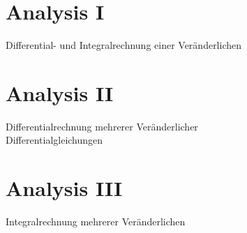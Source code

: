 \documentclass[a4paper,10pt]{article}
\title{}
\author{Marten Lienen}
\begin{document}
\maketitle

\section{Analysis I}
 
Differential- und Integralrechnung einer Veränderlichen

\section{Analysis II}

Differentialrechnung mehrerer Veränderlicher\\
Differentialgleichungen

\section{Analysis III}

Integralrechnung mehrerer Veränderlichen
\end{document}
